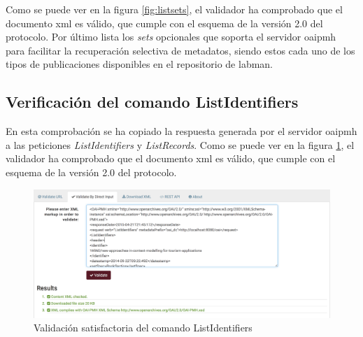 Como se puede ver en la figura \ref{fig:listsets}, el validador ha comprobado que el documento \acrshort{xml} es válido, que cumple con el esquema de la versión 2.0 del protocolo. Por último lista los \textit{sets} opcionales que soporta el servidor \acrshort{oaipmh} para facilitar la recuperación selectiva de metadatos, siendo estos cada uno de los tipos de publicaciones disponibles en el repositorio de \acrshort{labman}.

\subsection{Verificación del comando ListIdentifiers}

En esta comprobación se ha copiado la respuesta generada por el servidor \acrshort{oaipmh} a las peticiones \textit{ListIdentifiers} y \textit{ListRecords}. Como se puede ver en la figura \ref{fig:listidentifiers}, el validador ha comprobado que el documento \acrshort{xml} es válido, que cumple con el esquema de la versión 2.0 del protocolo.

\begin{figure}[!htbp]
	\centering
	\includegraphics[scale=0.32]{fig/oaipmh_validations/ListIdentifiers}
	\caption{Validación satisfactoria del comando ListIdentifiers}
	\label{fig:listidentifiers}
\end{figure}
